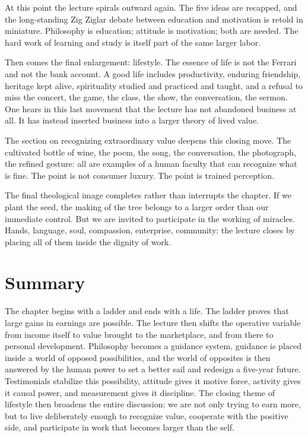 At this point the lecture spirals outward again. The five ideas are recapped, and the long-standing Zig Ziglar debate between education and motivation is retold in miniature. Philosophy is education; attitude is motivation; both are needed. The hard work of learning and study is itself part of the same larger labor.

Then comes the final enlargement: lifestyle. The essence of life is not the Ferrari and not the bank account. A good life includes productivity, enduring friendship, heritage kept alive, spirituality studied and practiced and taught, and a refusal to miss the concert, the game, the class, the show, the conversation, the sermon. One hears in this last movement that the lecture has not abandoned business at all. It has instead inserted business into a larger theory of lived value.

The section on recognizing extraordinary value deepens this closing move. The cultivated bottle of wine, the poem, the song, the conversation, the photograph, the refined gesture: all are examples of a human faculty that can recognize what is fine. The point is not consumer luxury. The point is trained perception.

The final theological image completes rather than interrupts the chapter. If we plant the seed, the making of the tree belongs to a larger order than our immediate control. But we are invited to participate in the working of miracles. Hands, language, soul, compassion, enterprise, community: the lecture closes by placing all of them inside the dignity of work.

\section{Summary}

The chapter begins with a ladder and ends with a life. The ladder proves that large gains in earnings are possible. The lecture then shifts the operative variable from income itself to value brought to the marketplace, and from there to personal development. Philosophy becomes a guidance system, guidance is placed inside a world of opposed possibilities, and the world of opposites is then answered by the human power to set a better sail and redesign a five-year future. Testimonials stabilize this possibility, attitude gives it motive force, activity gives it causal power, and measurement gives it discipline. The closing theme of lifestyle then broadens the entire discussion: we are not only trying to earn more, but to live deliberately enough to recognize value, cooperate with the positive side, and participate in work that becomes larger than the self.
